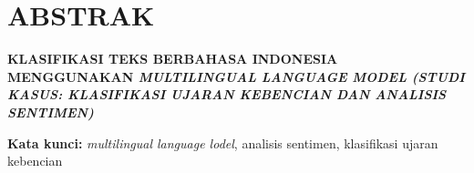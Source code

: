 \clearpage
\chapter*{ABSTRAK}
\begin{center} 
    \normalsize \bfseries \MakeUppercase{Klasifikasi Teks Berbahasa Indonesia Menggunakan \textit{Multilingual Language Model (Studi Kasus: Klasifikasi Ujaran Kebencian dan Analisis Sentimen)}} 

    \normalsize {}
\end{center}

\blindtext

\textbf{Kata kunci:} \textit{multilingual language lodel}, analisis sentimen, klasifikasi ujaran kebencian
\clearpage